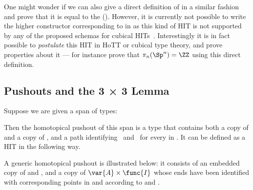 One might wonder if we can also give a direct definition of
 in a similar fashion and prove that it is equal to the
(). However, it is currently not possible to
write the higher constructor corresponding to  in \CubicalAgda 
as this kind of HIT is not supported by any of the proposed
schemas for cubical HITs~. Interestingly it
is in fact possible to \emph{postulate} this HIT in HoTT or cubical
type theory, and prove properties about it --- for instance
 prove that $\pi_n(\Sp^n) = \ZZ$ using this direct
definition.

\subsection{Pushouts and the 3 × 3 Lemma}
\label{sec:pushout}

Suppose we are given a span of types:

\begin{center}
\end{center}

Then the homotopical pushout of this span is a type that contains both
a copy of  and a copy of , and a path identifying
\, and \, for every  in .
It can be defined as a HIT in the following way.


A generic homotopical pushout is illustrated below: it consists of an
embedded copy of  and , and a copy of
\( \var{A} \times \func{I} \) whose ends have been identified with
corresponding points in  and  according to  and
.

